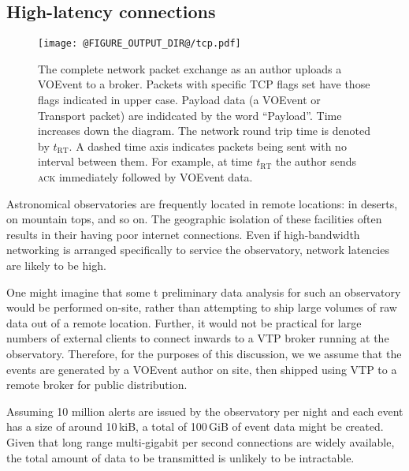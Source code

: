 \documentclass[5p,authoryear]{elsarticle}
\begin{document}
\subsection{High-latency connections}
\label{sec:perf:highlatency}

\begin{figure}
  \begin{center}
  \texttt{[image: @FIGURE\_OUTPUT\_DIR@/tcp.pdf]}
  \end{center}

  \caption{The complete network packet exchange as an author uploads a VOEvent
  to a broker. Packets with specific TCP flags set have those flags indicated
  in upper case. Payload data (a VOEvent or Transport packet) are indidcated
  by the word ``Payload''. Time increases down the diagram. The network round
  trip time is denoted by $t_\mathrm{RT}$. A dashed time axis indicates
  packets being sent with no interval between them. For example, at time
  $t_\mathrm{RT}$ the author sends \textsc{ack} immediately followed by
  VOEvent data.}

  \label{fig:tcp}
\end{figure}

Astronomical observatories are frequently located in remote locations: in
deserts, on mountain tops, and so on. The geographic isolation of these
facilities often results in their having poor internet connections. Even if
high-bandwidth networking is arranged specifically to service the observatory,
network latencies are likely to be high.

One might imagine that some t preliminary data analysis for such an
observatory would be performed on-site, rather than attempting to ship large
volumes of raw data out of a remote location. Further, it would not be
practical for large numbers of external clients to connect inwards to a VTP
broker running at the observatory. Therefore, for the purposes of this
discussion, we we assume that the events are generated by a VOEvent author on
site, then shipped using VTP to a remote broker for public distribution.

Assuming 10 million alerts are issued by the observatory per night and each
event has a size of around 10\,kiB, a total of 100\,GiB of event data might be
created. Given that long range multi-gigabit per second connections are widely
available, the total amount of data to be transmitted is unlikely to be
intractable.
\end{document}
